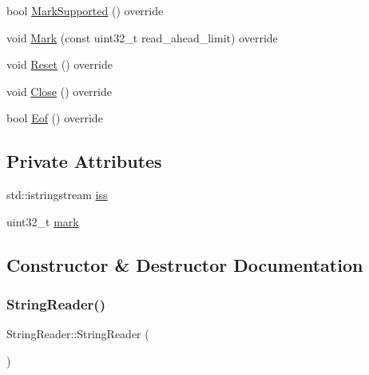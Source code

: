 \begin{DoxyCompactItemize}
\item 
bool \mbox{\hyperlink{classlucene_1_1core_1_1analysis_1_1StringReader_a1b9e55036f01d10650fd4026f23da629}{Mark\+Supported}} () override
\item 
void \mbox{\hyperlink{classlucene_1_1core_1_1analysis_1_1StringReader_a0ba42881881e4790dae54bc1c01063f5}{Mark}} (const uint32\+\_\+t read\+\_\+ahead\+\_\+limit) override
\item 
void \mbox{\hyperlink{classlucene_1_1core_1_1analysis_1_1StringReader_ab68ad2d8d2e375cd063c374c570fcffa}{Reset}} () override
\item 
void \mbox{\hyperlink{classlucene_1_1core_1_1analysis_1_1StringReader_ac2938d531e7842abb8423149982328e3}{Close}} () override
\item 
bool \mbox{\hyperlink{classlucene_1_1core_1_1analysis_1_1StringReader_a7697e462ff19e3e8fa135e38fa3e4999}{Eof}} () override
\end{DoxyCompactItemize}
\subsection*{Private Attributes}
\begin{DoxyCompactItemize}
\item 
std\+::istringstream \mbox{\hyperlink{classlucene_1_1core_1_1analysis_1_1StringReader_ada023622e5d849d9fe8e9fcb838af328}{iss}}
\item 
uint32\+\_\+t \mbox{\hyperlink{classlucene_1_1core_1_1analysis_1_1StringReader_a9a5cc9672f77bed7c252145fbde69176}{mark}}
\end{DoxyCompactItemize}


\subsection{Constructor \& Destructor Documentation}
\mbox{\label{classlucene_1_1core_1_1analysis_1_1StringReader_a58300c89dc23bee57f60fea22572d3da}} 
\subsubsection{\texorpdfstring{String\+Reader()}{StringReader()}\hspace{0.1cm}{\footnotesize\ttfamily [1/9]}}
{\footnotesize\ttfamily String\+Reader\+::\+String\+Reader (\begin{DoxyParamCaption}{ }\end{DoxyParamCaption})}

